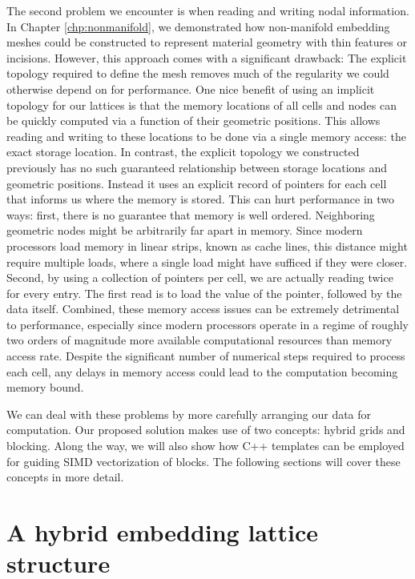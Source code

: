 The second problem we encounter is when reading and writing nodal
information. In Chapter \ref{chp:nonmanifold}, we demonstrated how
non-manifold embedding meshes could be constructed to represent
material geometry with thin features or incisions. However, this
approach comes with a significant drawback: The explicit topology
required to define the mesh removes much of the regularity we could
otherwise depend on for performance. One nice benefit of using an
implicit topology for our lattices is that the memory locations of all
cells and nodes can be quickly computed via a function of their
geometric positions. This allows reading and writing to these
locations to be done via a single memory access: the exact storage
location. In contrast, the explicit topology we constructed
previously has no such guaranteed relationship between storage
locations and geometric positions. Instead it uses an explicit record
of pointers for each cell that informs us where the memory is
stored. This can hurt performance in two ways: first, there is no
guarantee that memory is well ordered. Neighboring geometric nodes
might be arbitrarily far apart in memory. Since modern processors load memory in
linear strips, known as cache lines, this distance might require
multiple loads, where a single load might have sufficed if they were
closer. Second, by using a collection of pointers per cell, we are
actually reading twice for every entry. The first read is to load the
value of the pointer, followed by the data itself. Combined, these
memory access issues can be extremely detrimental to performance,
especially since modern processors operate in a regime of roughly two
orders of magnitude more available computational resources than memory
access rate. Despite the significant number of numerical steps
required to process each cell, any delays in memory access could lead
to the computation becoming memory bound.

We can deal with these problems by more carefully arranging our data
for computation. Our proposed solution makes use of two concepts:
hybrid grids and blocking. Along the way, we will also show how C++
templates can be employed for guiding SIMD vectorization of
blocks. The following sections will cover these concepts in more detail.

\section{A hybrid embedding lattice structure}
\label{sec:hybrid}

